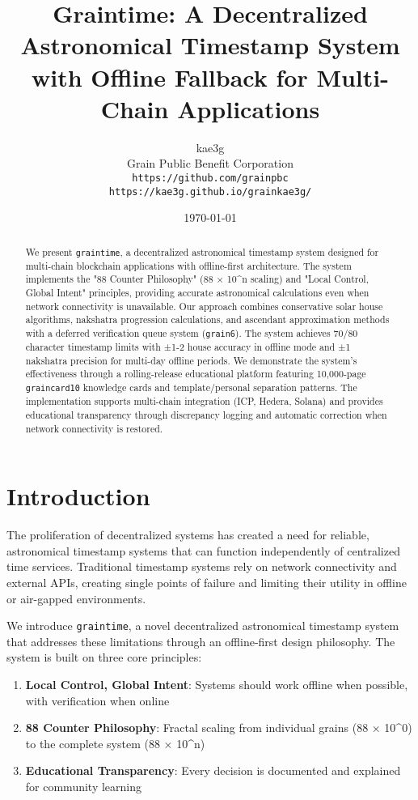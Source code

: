 \documentclass[11pt]{article}
\title{Graintime: A Decentralized Astronomical Timestamp System with Offline Fallback for Multi-Chain Applications}
\author{
    kae3g \\
    Grain Public Benefit Corporation \\
    \texttt{https://github.com/grainpbc} \\
    \texttt{https://kae3g.github.io/grainkae3g/}
}
\date{\today}
\newcommand{\graintime}{\texttt{graintime}}
\newcommand{\graincard}{\texttt{graincard10}}
\begin{document}
\maketitle

\begin{abstract}
We present \graintime, a decentralized astronomical timestamp system designed for multi-chain blockchain applications with offline-first architecture. The system implements the "88 Counter Philosophy" (88 × 10^n scaling) and "Local Control, Global Intent" principles, providing accurate astronomical calculations even when network connectivity is unavailable. Our approach combines conservative solar house algorithms, nakshatra progression calculations, and ascendant approximation methods with a deferred verification queue system (\texttt{grain6}). The system achieves 70/80 character timestamp limits with ±1-2 house accuracy in offline mode and ±1 nakshatra precision for multi-day offline periods. We demonstrate the system's effectiveness through a rolling-release educational platform featuring 10,000-page \graincard{} knowledge cards and template/personal separation patterns. The implementation supports multi-chain integration (ICP, Hedera, Solana) and provides educational transparency through discrepancy logging and automatic correction when network connectivity is restored.
\end{abstract}

\section{Introduction}

The proliferation of decentralized systems has created a need for reliable, astronomical timestamp systems that can function independently of centralized time services. Traditional timestamp systems rely on network connectivity and external APIs, creating single points of failure and limiting their utility in offline or air-gapped environments.

We introduce \graintime, a novel decentralized astronomical timestamp system that addresses these limitations through an offline-first design philosophy. The system is built on three core principles:

\begin{enumerate}
    \item \textbf{Local Control, Global Intent}: Systems should work offline when possible, with verification when online
    \item \textbf{88 Counter Philosophy}: Fractal scaling from individual grains (88 × 10^0) to the complete system (88 × 10^n)
    \item \textbf{Educational Transparency}: Every decision is documented and explained for community learning
\end{enumerate}
\end{document}
